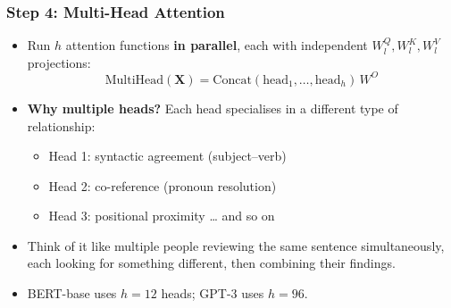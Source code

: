 \begin{frame}[fragile]\frametitle{Step 4: Multi-Head Attention}
\begin{itemize}
\item Run $h$ attention functions \textbf{in parallel}, each with independent $W^Q_l, W^K_l, W^V_l$ projections:
\[
  \text{MultiHead}(\mathbf{X}) = \text{Concat}(\text{head}_1, \ldots, \text{head}_h)\,W^O
\]
\item \textbf{Why multiple heads?} Each head specialises in a different type of relationship:
  \begin{itemize}
  \item Head 1: syntactic agreement (subject–verb)
  \item Head 2: co-reference (pronoun resolution)
  \item Head 3: positional proximity … and so on
  \end{itemize}
\item Think of it like multiple people reviewing the same sentence simultaneously, each looking for something different,  then combining their findings.
\item BERT-base uses $h=12$ heads; GPT-3 uses $h=96$.
\end{itemize}
\end{frame}


